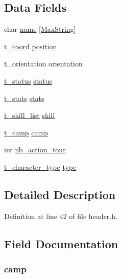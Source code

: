 \subsection*{Data Fields}
\begin{DoxyCompactItemize}
\item 
char \hyperlink{structt__character_ab27f28c5ead39031421706ddbbd1edea}{name} \mbox{[}\hyperlink{header_8h_ab154998a3a376095f3601bc35c5cf523}{Max\-String}\mbox{]}
\item 
\hyperlink{structt__coord}{t\-\_\-coord} \hyperlink{structt__character_a27c93348dcaa3ea78282fb5ef6ce371b}{position}
\item 
\hyperlink{header_8h_a6dc6eccccaf78ef029cff998c0e654f4}{t\-\_\-orientation} \hyperlink{structt__character_af778044107ad1a59b9725fa3962560ad}{orientation}
\item 
\hyperlink{structt__status}{t\-\_\-status} \hyperlink{structt__character_a3ade6b90793e915ca28b52fb70e58e3f}{status}
\item 
\hyperlink{structt__stats}{t\-\_\-stats} \hyperlink{structt__character_a29711825af64d428d19df366a5056670}{stats}
\item 
\hyperlink{structt__skill__list}{t\-\_\-skill\-\_\-list} \hyperlink{structt__character_ae7aa14804e69b1bc9652c16261da0c9f}{skill}
\item 
\hyperlink{header_8h_a4bb25c9352f7bb2ea2eb663ccf579528}{t\-\_\-camp} \hyperlink{structt__character_a48707185be865bad67e5c61e5903ae5a}{camp}
\item 
int \hyperlink{structt__character_aaff424b51f4bd3db2c199cc08f21f86d}{nb\-\_\-action\-\_\-tour}
\item 
\hyperlink{header_8h_ac8020d257c824e4b188c04ee386ebfda}{t\-\_\-character\-\_\-type} \hyperlink{structt__character_a3b5fecb9824668aab778f82005089942}{type}
\end{DoxyCompactItemize}


\subsection{Detailed Description}


Definition at line 42 of file header.\-h.



\subsection{Field Documentation}
\hypertarget{structt__character_a48707185be865bad67e5c61e5903ae5a}{
\subsubsection[{camp}]{ camp}}\label{structt__character_a48707185be865bad67e5c61e5903ae5a}


